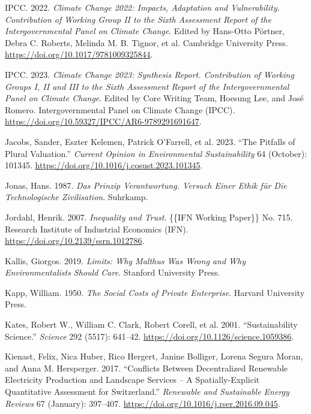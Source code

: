 \documentclass[
  a4paper,
  DIV=11,
  numbers=noendperiod,
  oneside,
  openany]{scrreprt}
\newlength{\cslhangindent}
\newenvironment{CSLReferences}[2] %
 {\begin{list}{}{%
  \setlength{\itemindent}{0pt}
  \setlength{\leftmargin}{0pt}
  \setlength{\parsep}{0pt}
  \ifodd #1
   \setlength{\leftmargin}{\cslhangindent}
   \setlength{\itemindent}{-1\cslhangindent}
  \fi
  \setlength{\itemsep}{#2\baselineskip}}}
 {\end{list}}
\begin{document}
\begin{CSLReferences}{1}{1}
IPCC. 2022. \emph{Climate {Change} 2022: {Impacts}, Adaptation and
Vulnerability. {Contribution} of {Working Group II} to the {Sixth
Assessment Report} of the {Intergovernmental Panel} on {Climate
Change}}. Edited by Hans-Otto Pörtner, Debra C. Roberts, Melinda M. B.
Tignor, et al. Cambridge University Press.
\url{https://doi.org/10.1017/9781009325844}.

IPCC. 2023. \emph{Climate {Change} 2023: {Synthesis Report}.
{Contribution} of {Working Groups I}, {II} and {III} to the {Sixth
Assessment Report} of the {Intergovernmental Panel} on {Climate
Change}}. Edited by Core Writing Team, Hoesung Lee, and José Romero.
Intergovernmental Panel on Climate Change (IPCC).
\url{https://doi.org/10.59327/IPCC/AR6-9789291691647}.

Jacobs, Sander, Eszter Kelemen, Patrick O'Farrell, et al. 2023. {``The
Pitfalls of Plural Valuation.''} \emph{Current Opinion in Environmental
Sustainability} 64 (October): 101345.
\url{https://doi.org/10.1016/j.cosust.2023.101345}.

Jonas, Hans. 1987. \emph{Das {Prinzip Verantwortung}. {Versuch} Einer
{Ethik} f{ü}r Die Technologische {Zivilisation}}. Suhrkamp.

Jordahl, Henrik. 2007. \emph{Inequality and {Trust}}. \{\{IFN Working
Paper\}\} No. 715. Research Institute of Industrial Economics (IFN).
\url{https://doi.org/10.2139/ssrn.1012786}.

Kallis, Giorgos. 2019. \emph{Limits: {Why Malthus Was Wrong} and {Why
Environmentalists Should Care}}. Stanford University Press.

Kapp, William. 1950. \emph{The {Social Costs} of {Private Enterprise}}.
Harvard University Press.

Kates, Robert W., William C. Clark, Robert Corell, et al. 2001.
{``Sustainability {Science}.''} \emph{Science} 292 (5517): 641--42.
\url{https://doi.org/10.1126/science.1059386}.

Kienast, Felix, Nica Huber, Rico Hergert, Janine Bolliger, Lorena Segura
Moran, and Anna M. Hersperger. 2017. {``Conflicts Between Decentralized
Renewable Electricity Production and Landscape Services -- {A}
Spatially-Explicit Quantitative Assessment for {Switzerland}.''}
\emph{Renewable and Sustainable Energy Reviews} 67 (January): 397--407.
\url{https://doi.org/10.1016/j.rser.2016.09.045}.


\end{CSLReferences}
\end{document}
